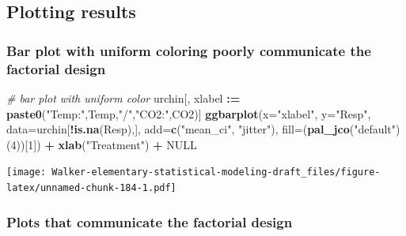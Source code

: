 \documentclass[]{book}
\newenvironment{Shaded}{\begin{snugshade}}{\end{snugshade}}
\newcommand{\CommentTok}[1]{\textcolor[rgb]{0.56,0.35,0.01}{\textit{#1}}}
\newcommand{\DataTypeTok}[1]{\textcolor[rgb]{0.13,0.29,0.53}{#1}}
\newcommand{\DecValTok}[1]{\textcolor[rgb]{0.00,0.00,0.81}{#1}}
\newcommand{\ErrorTok}[1]{\textcolor[rgb]{0.64,0.00,0.00}{\textbf{#1}}}
\newcommand{\KeywordTok}[1]{\textcolor[rgb]{0.13,0.29,0.53}{\textbf{#1}}}
\newcommand{\NormalTok}[1]{#1}
\newcommand{\OperatorTok}[1]{\textcolor[rgb]{0.81,0.36,0.00}{\textbf{#1}}}
\newcommand{\OtherTok}[1]{\textcolor[rgb]{0.56,0.35,0.01}{#1}}
\newcommand{\StringTok}[1]{\textcolor[rgb]{0.31,0.60,0.02}{#1}}
\begin{document}
\hypertarget{plotting-results}{%
\subsection{Plotting results}\label{plotting-results}}

\hypertarget{bar-plot-with-uniform-coloring-poorly-communicate-the-factorial-design}{%
\subsubsection{Bar plot with uniform coloring poorly communicate the factorial design}\label{bar-plot-with-uniform-coloring-poorly-communicate-the-factorial-design}}

\begin{Shaded}
\begin{Highlighting}[]
\CommentTok{# bar plot with uniform color}
\NormalTok{urchin[, xlabel }\OperatorTok{:}\ErrorTok{=}\StringTok{ }\KeywordTok{paste0}\NormalTok{(}\StringTok{"Temp:"}\NormalTok{,Temp,}\StringTok{"/"}\NormalTok{,}\StringTok{"CO2:"}\NormalTok{,CO2)]}
\KeywordTok{ggbarplot}\NormalTok{(}\DataTypeTok{x=}\StringTok{"xlabel"}\NormalTok{,}
          \DataTypeTok{y=}\StringTok{"Resp"}\NormalTok{,}
          \DataTypeTok{data=}\NormalTok{urchin[}\OperatorTok{!}\KeywordTok{is.na}\NormalTok{(Resp),],}
          \DataTypeTok{add=}\KeywordTok{c}\NormalTok{(}\StringTok{"mean_ci"}\NormalTok{, }\StringTok{"jitter"}\NormalTok{),}
          \DataTypeTok{fill=}\NormalTok{(}\KeywordTok{pal_jco}\NormalTok{(}\StringTok{"default"}\NormalTok{)(}\DecValTok{4}\NormalTok{))[}\DecValTok{1}\NormalTok{]) }\OperatorTok{+}
\StringTok{  }\KeywordTok{xlab}\NormalTok{(}\StringTok{"Treatment"}\NormalTok{) }\OperatorTok{+}
\StringTok{  }\OtherTok{NULL}
\end{Highlighting}
\end{Shaded}

\texttt{[image: Walker-elementary-statistical-modeling-draft\_files/figure-latex/unnamed-chunk-184-1.pdf]}

\hypertarget{plots-that-communicate-the-factorial-design}{%
\subsubsection{Plots that communicate the factorial design}\label{plots-that-communicate-the-factorial-design}}
\end{document}
